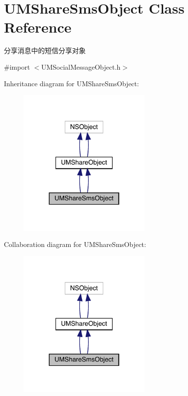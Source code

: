 \hypertarget{interface_u_m_share_sms_object}{}\section{U\+M\+Share\+Sms\+Object Class Reference}
\label{interface_u_m_share_sms_object}


分享消息中的短信分享对象  




{\ttfamily \#import $<$U\+M\+Social\+Message\+Object.\+h$>$}



Inheritance diagram for U\+M\+Share\+Sms\+Object\+:\nopagebreak
\begin{figure}[H]
\begin{center}
\leavevmode
\includegraphics[width=187pt]{interface_u_m_share_sms_object__inherit__graph}
\end{center}
\end{figure}


Collaboration diagram for U\+M\+Share\+Sms\+Object\+:\nopagebreak
\begin{figure}[H]
\begin{center}
\leavevmode
\includegraphics[width=187pt]{interface_u_m_share_sms_object__coll__graph}
\end{center}
\end{figure}
